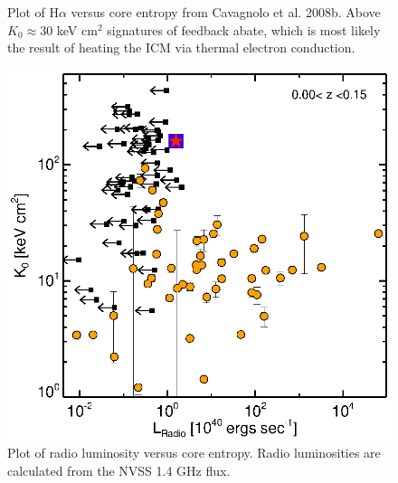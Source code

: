 \documentclass[letterpaper,11pt]{article}
\begin{document}
\begin{figure}[t]
\begin{minipage}[t]{0.5\linewidth}
        \caption{\small
	Plot of H$\alpha$ versus core entropy from
	Cavagnolo et al. 2008b. Above $K_0 \approx 30$ keV cm$^2$ signatures
	of feedback abate, which is most likely the result of heating the ICM
	via thermal electron conduction.}
        \label{fig:ha}
    \end{minipage}
    \hspace{0.25cm}
    \begin{minipage}[t]{0.5\linewidth}
        \centering
        \includegraphics*[width=\textwidth, trim=22mm 8mm 30mm 15mm, clip]{k0rad}
        \caption{\small
	Plot of radio luminosity versus core entropy. Radio
	luminosities are calculated from the NVSS 1.4 GHz flux.
	}
        \label{fig:rad}
    \end{minipage}
    \hspace{0.25cm}
    \begin{minipage}[t]{0.5\linewidth}

\end{minipage}
\end{figure}
\end{document}

